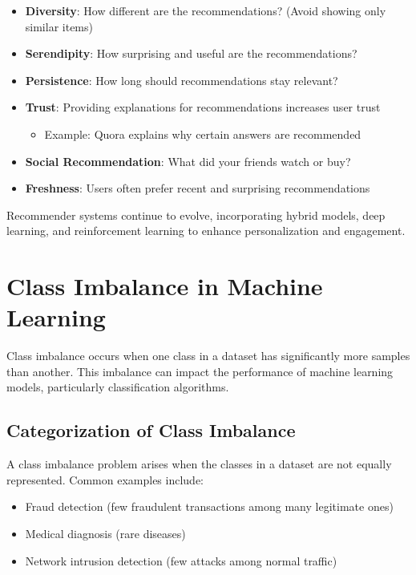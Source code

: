 \documentclass[
  letterpaper,
  DIV=11,
  numbers=noendperiod]{scrreprt}
\providecommand{\tightlist}{%
  \setlength{\itemsep}{0pt}\setlength{\parskip}{0pt}}\usepackage{longtable,booktabs,array}
\begin{document}
\begin{itemize}
\tightlist
\item
  \textbf{Diversity}: How different are the recommendations? (Avoid
  showing only similar items)
\item
  \textbf{Serendipity}: How surprising and useful are the
  recommendations?
\item
  \textbf{Persistence}: How long should recommendations stay relevant?
\item
  \textbf{Trust}: Providing explanations for recommendations increases
  user trust

  \begin{itemize}
  \tightlist
  \item
    Example: Quora explains why certain answers are recommended
  \end{itemize}
\item
  \textbf{Social Recommendation}: What did your friends watch or buy?
\item
  \textbf{Freshness}: Users often prefer recent and surprising
  recommendations
\end{itemize}

Recommender systems continue to evolve, incorporating hybrid models,
deep learning, and reinforcement learning to enhance personalization and
engagement.


\chapter{Class Imbalance in Machine
Learning}\label{class-imbalance-in-machine-learning}

Class imbalance occurs when one class in a dataset has significantly
more samples than another. This imbalance can impact the performance of
machine learning models, particularly classification algorithms.

\section{Categorization of Class
Imbalance}\label{categorization-of-class-imbalance}

A class imbalance problem arises when the classes in a dataset are not
equally represented. Common examples include:

\begin{itemize}
\tightlist
\item
  Fraud detection (few fraudulent transactions among many legitimate
  ones)
\item
  Medical diagnosis (rare diseases)
\item
  Network intrusion detection (few attacks among normal traffic)
\end{itemize}
\end{document}
